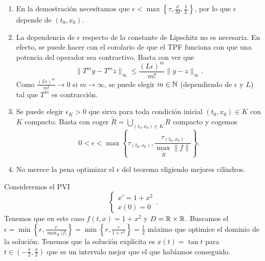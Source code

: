 \begin{observation}
	\begin{enumerate}
	\item En la demostración necesitamos que $\displaystyle \epsilon < \max \left\{ \tau, \frac{\rho}{M}, \frac{1}{L}\right\}  $, por lo que $\displaystyle \epsilon  $ depende de $\displaystyle \left(t_{0}, x_{0}\right) $. 
	\item La dependencia de $\displaystyle \epsilon  $ respecto de la constante de Lipschitz no es necesaria. En efecto, se puede hacer con el corolario de que el TPF funciona con que una potencia del operador sea contractivo. Basta con ver que 
		\[\|T^{m}y-T^{m}z\|_{\infty } \leq \frac{\left(L\epsilon \right)^{m}}{m!}\|y-z\|_{\infty } .\]
		Como $\displaystyle \frac{\left(L\epsilon \right)^{m}}{m!}\to 0 $ si $\displaystyle m \to \infty $, se puede elegir $\displaystyle m \in \mathbb{N} $ (dependiendo de $\displaystyle \epsilon  $ y $\displaystyle L $) tal que $\displaystyle T^{m} $ es contracción. 
	\item Se puede elegir $\displaystyle \epsilon _{K} > 0 $ que sirva para toda condición inicial $\displaystyle \left(t_{0}, x_{0}\right)\in K $ con $\displaystyle K $ compacto. Basta con coger $\displaystyle \tilde{R} = \bigcup_{\left(t_{0}, x_{0}\right)\in K}R $ compacto y cogemos 
		\[0 < \epsilon < \max \left\{ \tau_{\left(t_{0}, x_{0}\right)}, \frac{\tau_{\left(t_{0}, x_{0}\right)}}{\max_{\tilde{R}}\|f\|}\right\} .\]
	\item No merece la pena optimizar el $\displaystyle \epsilon  $ del teorema eligiendo mejores cilindros. 
	\end{enumerate}
\end{observation}
\begin{eg}
Consideremos el PVI
\[
\begin{cases}
x' = 1 + x^{2} \\
x\left(0\right)=0
\end{cases}
.\]
Tenemos que en este caso $\displaystyle f\left(t,x\right)=1+x^{2} $ y $\displaystyle D = \mathbb{R} \times \mathbb{R} $. Buscamos el $\displaystyle \epsilon = \min \left\{ r, \frac{r}{\max_{R} \left|f\right|}\right\} =\min \left\{ r, \frac{r}{1+r^{2}}\right\} =\frac{1}{2} $ máximo que optimice el dominio de la solución. Tenemos que la solución explícita es $\displaystyle x\left(t\right)=\tan t $ para $\displaystyle t \in \left(-\frac{\pi }{2}, \frac{\pi }{2}\right) $ que es un intervalo mejor que el que habíamos conseguido.
\end{eg}

